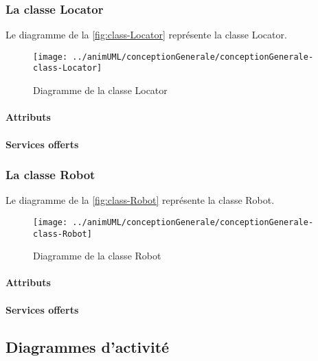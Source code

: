\subsubsection{La classe Locator}

Le diagramme de la \autoref{fig:class-Locator} représente la classe Locator.
\begin{figure}[H]
	\centering
	\texttt{[image: ../animUML/conceptionGenerale/conceptionGenerale-class-Locator]}
	\caption{Diagramme de la classe Locator}
	\label{fig:class-Locator}
\end{figure}


\paragraph{Attributs}
\classLocatorProperties
\paragraph{Services offerts}
\classLocatorOperations
\subsubsection{La classe Robot}

Le diagramme de la \autoref{fig:class-Robot} représente la classe Robot.
\begin{figure}[H]
	\centering
	\texttt{[image: ../animUML/conceptionGenerale/conceptionGenerale-class-Robot]}
	\caption{Diagramme de la classe Robot}
	\label{fig:class-Robot}
\end{figure}


\paragraph{Attributs}
\classRobotProperties
\paragraph{Services offerts}
\classRobotOperations

\subsection{Diagrammes d'activité}

